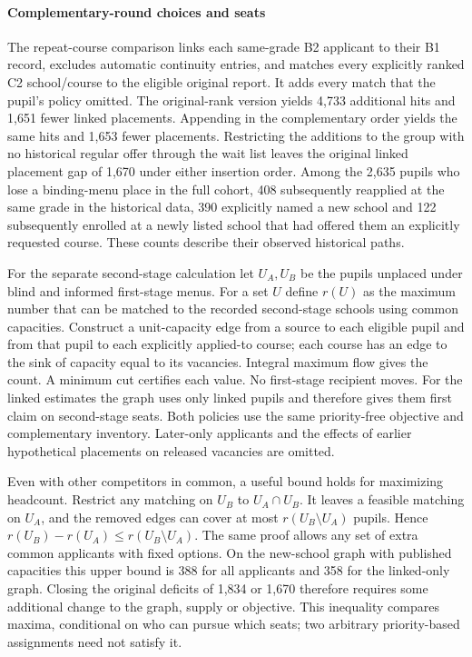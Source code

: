 \paragraph{Complementary-round choices and seats}
The repeat-course comparison links each same-grade B2 applicant to their B1 record, excludes automatic continuity entries, and matches every explicitly ranked C2 school/course to the eligible original report. It adds every match that the pupil's policy omitted. The original-rank version yields 4,733 additional hits and 1,651 fewer linked placements. Appending in the complementary order yields the same hits and 1,653 fewer placements. Restricting the additions to the group with no historical regular offer through the wait list leaves the original linked placement gap of 1,670 under either insertion order. Among the 2,635 pupils who lose a binding-menu place in the full cohort, 408 subsequently reapplied at the same grade in the historical data, 390 explicitly named a new school and 122 subsequently enrolled at a newly listed school that had offered them an explicitly requested course. These counts describe their observed historical paths.

For the separate second-stage calculation let $U_A,U_B$ be the pupils unplaced under blind and informed first-stage menus. For a set $U$ define $r(U)$ as the maximum number that can be matched to the recorded second-stage schools using common capacities. Construct a unit-capacity edge from a source to each eligible pupil and from that pupil to each explicitly applied-to course; each course has an edge to the sink of capacity equal to its vacancies. Integral maximum flow gives the count. A minimum cut certifies each value. No first-stage recipient moves. For the linked estimates the graph uses only linked pupils and therefore gives them first claim on second-stage seats. Both policies use the same priority-free objective and complementary inventory. Later-only applicants and the effects of earlier hypothetical placements on released vacancies are omitted.

Even with other competitors in common, a useful bound holds for maximizing headcount. Restrict any matching on $U_B$ to $U_A\cap U_B$. It leaves a feasible matching on $U_A$, and the removed edges can cover at most $r(U_B\setminus U_A)$ pupils. Hence $r(U_B)-r(U_A)\leq r(U_B\setminus U_A)$. The same proof allows any set of extra common applicants with fixed options. On the new-school graph with published capacities this upper bound is 388 for all applicants and 358 for the linked-only graph. Closing the original deficits of 1,834 or 1,670 therefore requires some additional change to the graph, supply or objective. This inequality compares maxima, conditional on who can pursue which seats; two arbitrary priority-based assignments need not satisfy it.

